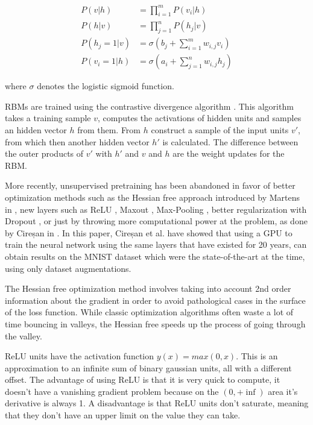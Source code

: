 \begin{align*}
	P(v|h) &= \prod_{i=1}^m P(v_i|h) \\
	P(h|v) &= \prod_{j=1}^n P(h_j|v) \\
	P(h_j=1|v) &= \sigma \left(b_j + \sum_{i=1}^m w_{i,j} v_i \right) \\ 
	P(v_i=1|h) &= \sigma \left(a_i + \sum_{j=1}^n w_{i,j} h_j \right)
\end{align*}

where $ \sigma $ denotes the logistic sigmoid function.

RBMs are trained using the contrastive divergence algorithm \cite{hinton2002training}. This algorithm takes a training sample $ v $, computes the activations of hidden units and samples an hidden vector $h$ from them. From $h$ construct a sample of the input units $ v'$, from which then another hidden vector $ h' $ is calculated. The difference between the outer products of $ v' $ with $ h' $ and $ v $ and $ h $ are the weight updates for the RBM. 

More recently, unsupervised pretraining has been abandoned in favor of better optimization methods such as the Hessian free approach introduced by Martens in \cite{martens2010deep}, new layers such as ReLU \cite{nair2010rectified}, Maxout \cite{goodfellow2013maxout}, Max-Pooling \cite{scherer2010evaluation}, better regularization with Dropout \cite{hinton2012improving}, or just by throwing more computational power at the problem, as done by Cireșan in \cite{Cire_an_2010}. In this paper, Cireșan et al. have showed that using a GPU to train the neural network using the same layers that have existed for 20 years, can obtain results on the MNIST dataset which were the state-of-the-art at the time, using only dataset augmentations. 

The Hessian free optimization method involves taking into account 2nd order information about the gradient in order to avoid pathological cases in the surface of the loss function. While classic optimization algorithms often waste a lot of time bouncing in valleys, the Hessian free speeds up the process of going through the valley. 

ReLU units have the activation function $ y(x) = max(0,x) $. This is an approximation to an infinite sum of binary gaussian units, all with a different offset. The advantage of using ReLU is that it is very quick to compute, it doesn't have a vanishing gradient problem because on the $ (0, +\inf) $ area it's derivative is always 1. A disadvantage is that ReLU units don't saturate, meaning that they don't have an upper limit on the value they can take. 
